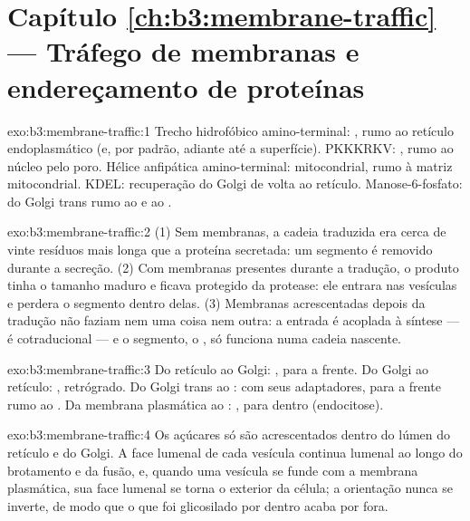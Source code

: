\section*{Capítulo \ref{ch:b3:membrane-traffic} --- Tráfego de membranas e endereçamento de proteínas}

\begin{solution}{exo:b3:membrane-traffic:1}
Trecho hidrofóbico amino-terminal: , rumo ao retículo
endoplasmático (e, por padrão, adiante até a superfície). PKKKRKV:
, rumo ao núcleo pelo poro. Hélice
anfipática amino-terminal:  mitocondrial, rumo à matriz
mitocondrial. KDEL: recuperação do Golgi de volta ao retículo.
Manose-6-fosfato: do Golgi trans rumo ao  e ao .
\end{solution}

\begin{solution}{exo:b3:membrane-traffic:2}
(1) Sem membranas, a cadeia traduzida era cerca de vinte resíduos mais
longa que a proteína secretada: um segmento é removido durante a
secreção. (2) Com membranas presentes durante a tradução, o produto
tinha o tamanho maduro e ficava protegido da protease: ele entrara nas
vesículas e perdera o segmento dentro delas. (3) Membranas
acrescentadas depois da tradução não faziam nem uma coisa nem outra: a
entrada é acoplada à síntese --- é cotraducional --- e o segmento, o
, só funciona numa cadeia nascente.
\end{solution}

\begin{solution}{exo:b3:membrane-traffic:3}
Do retículo ao Golgi: , para a frente. Do Golgi ao retículo:
, retrógrado. Do Golgi trans ao :  com seus
adaptadores, para a frente rumo ao . Da membrana plasmática ao
: , para dentro (endocitose).
\end{solution}

\begin{solution}{exo:b3:membrane-traffic:4}
Os açúcares só são acrescentados dentro do lúmen do retículo e do
Golgi. A face lumenal de cada vesícula continua lumenal ao longo do
brotamento e da fusão, e, quando uma vesícula se funde com a membrana
plasmática, sua face lumenal se torna o exterior da célula; a
orientação nunca se inverte, de modo que o que foi glicosilado por
dentro acaba por fora.
\end{solution}

